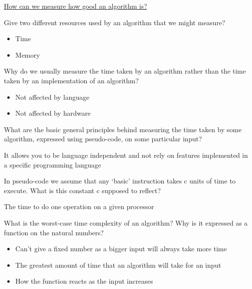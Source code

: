 \documentclass[addpoints]{exam}
\begin{document}
\begin{center}
	\underline{\huge How can we measure how good an algorithm is?}
\end{center}
\begin{questions}
\question[2]Give two different resources used by an algorithm that we might measure?
\begin{solution}[2in]
	\begin{itemize}
		\item Time
		\item Memory
	\end{itemize}
\end{solution}

\question[2]Why do we usually measure the time taken by an algorithm rather than
the time taken by an implementation of an algorithm?
\begin{solution}[2in]
	\begin{itemize}
		\item Not affected by language
		\item Not affected by hardware
	\end{itemize}
\end{solution}

\question[3]What are the basic general principles behind measuring the time taken
by some algorithm, expressed using pseudo-code, on some particular
input?
\begin{solution}[2in]
	It allows you to be language independent and not rely on features implemented in a specific programming language
\end{solution}

\question[2]In pseudo-code we assume that any ‘basic’ instruction takes c units of
time to execute. What is this constant c supposed to reflect?
\begin{solution}[2in]
	The time to do one operation on a given processor
\end{solution}

\question[4]What is the worst-case time complexity of an algorithm? Why is it
expressed as a function on the natural numbers? 
\begin{solution}[2in]
	\begin{itemize}
		\item Can't give a fixed number as a bigger input will always take more time
		\item The greatest amount of time that an algorithm will take for an input
		\item How the function reacts as the input increases
	\end{itemize}
\end{solution}


\end{questions}
\end{document}
